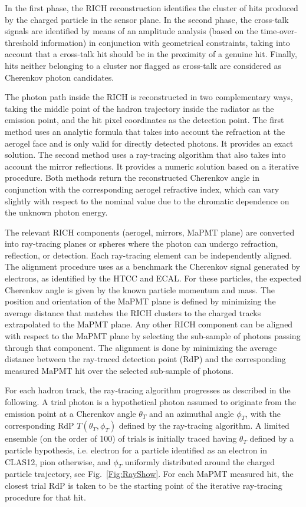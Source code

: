 In the first phase, the RICH reconstruction identifies the cluster of hits produced by the charged particle in the
sensor plane. In the second phase, the cross-talk signals are identified by means of an amplitude analysis (based on
the time-over-threshold information) in conjunction with geometrical constraints, taking into account that a cross-talk
hit should be in the proximity of a genuine hit. Finally, hits neither belonging to a cluster nor flagged as cross-talk are
considered as Cherenkov photon candidates. 

The photon path inside the RICH is reconstructed in two complementary ways, taking the middle point of the hadron
trajectory inside the radiator as the emission point, and the hit pixel coordinates as the detection point. The first
method uses an analytic formula that takes into account the refraction at the aerogel face and is only valid for directly
detected photons. It provides an exact solution. The second method uses a ray-tracing algorithm that also takes into
account the mirror reflections. It provides a numeric solution based on a iterative procedure. Both methods return the
reconstructed Cherenkov angle in conjunction with the corresponding aerogel refractive index, which can vary slightly
with respect to the nominal value due to the chromatic dependence on the unknown photon energy.

The relevant RICH components (aerogel, mirrors, MaPMT plane) are converted into ray-tracing planes or spheres
where the photon can undergo refraction, reflection, or detection. Each ray-tracing element can be independently
aligned. The alignment procedure uses as a benchmark the Cherenkov signal generated by electrons, as identified
by the HTCC and ECAL. For these particles, the expected Cherenkov angle is given by the known particle momentum
and mass. The position and orientation of the MaPMT plane is defined by minimizing the average distance that
matches the RICH clusters to the charged tracks extrapolated to the MaPMT plane. Any other RICH component can
be aligned with respect to the MaPMT plane by selecting the sub-sample of photons passing through that component.
The alignment is done by minimizing the average distance between the ray-traced detection point (RdP) and the
corresponding measured MaPMT hit over the selected sub-sample of photons.

For each hadron track, the ray-tracing algorithm progresses as described in the following. A trial photon is a
hypothetical photon assumed to originate from the emission point at a Cherenkov angle $\theta_T$ and an azimuthal
angle $\phi_T$, with the corresponding RdP $T(\theta_T, \phi_T)$ defined by the ray-tracing algorithm. A limited
ensemble (on the order of 100) of trials is initially traced having $\theta_T$ defined by a particle hypothesis, i.e.
electron for a particle identified as an electron in CLAS12, pion otherwise, and $\phi_T$ uniformly distributed around
the charged particle trajectory, see Fig.~\ref{Fig:RayShow}. For each MaPMT measured hit, the closest trial RdP is
taken to be the starting point of the iterative ray-tracing procedure for that hit.

